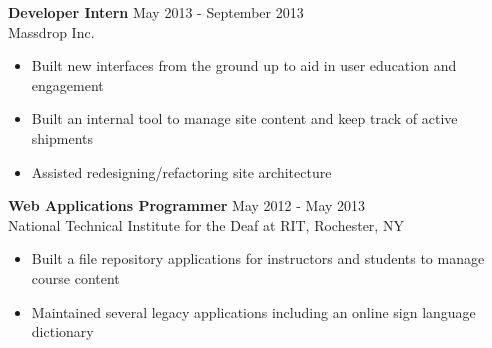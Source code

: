 \documentclass[line,margin]{res}
\begin{document}
\begin{resume}
{\bf Developer Intern} \hfill May 2013 - September 2013\\
    Massdrop Inc.
    \begin{itemize}
    \item Built new interfaces from the ground up to aid in user education and engagement
    \item Built an internal tool to manage site content and keep track of active shipments
    \item Assisted redesigning/refactoring site architecture
    \end{itemize}

{\bf Web Applications Programmer} \hfill May 2012 - May 2013\\
    National Technical Institute for the Deaf at RIT,
  Rochester, NY

  \begin{itemize} %
  \item Built a file repository applications for instructors and students to manage course content
  \item Maintained several legacy applications including an online sign language dictionary
  \end{itemize}

\end{resume}
\end{document}
